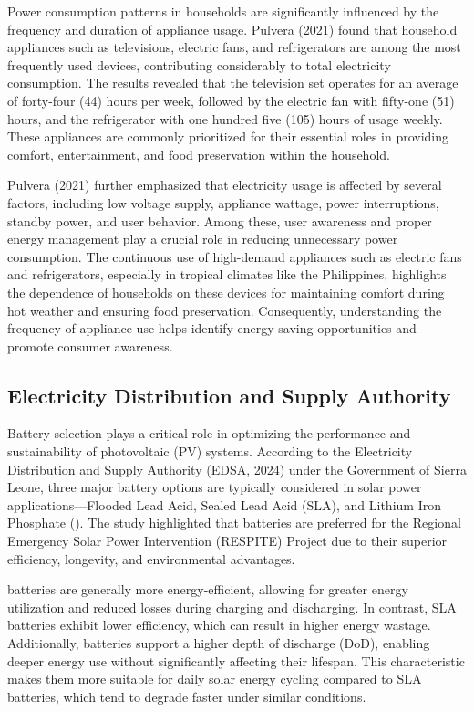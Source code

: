 {Power consumption patterns in households are significantly influenced by the frequency and duration of appliance usage. Pulvera (2021) found that household appliances such as televisions, electric fans, and refrigerators are among the most frequently used devices, contributing considerably to total electricity consumption. The results revealed that the television set operates for an average of forty-four (44) hours per week, followed by the electric fan with fifty-one (51) hours, and the refrigerator with one hundred five (105) hours of usage weekly. These appliances are commonly prioritized for their essential roles in providing comfort, entertainment, and food preservation within the household.

Pulvera (2021) further emphasized that electricity usage is affected by several factors, including low voltage supply, appliance wattage, power interruptions, standby power, and user behavior. Among these, user awareness and proper energy management play a crucial role in reducing unnecessary power consumption. The continuous use of high-demand appliances such as electric fans and refrigerators, especially in tropical climates like the Philippines, highlights the dependence of households on these devices for maintaining comfort during hot weather and ensuring food preservation. Consequently, understanding the frequency of appliance use helps identify energy-saving opportunities and promote consumer awareness.

\subsection{Electricity Distribution and Supply Authority}

Battery selection plays a critical role in optimizing the performance and sustainability of photovoltaic (PV) systems. According to the Electricity Distribution and Supply Authority (EDSA, 2024) under the Government of Sierra Leone, three major battery options are typically considered in solar power applications—Flooded Lead Acid, Sealed Lead Acid (SLA), and Lithium Iron Phosphate (). The study highlighted that  batteries are preferred for the Regional Emergency Solar Power Intervention (RESPITE) Project due to their superior efficiency, longevity, and environmental advantages.

 batteries are generally more energy-efficient, allowing for greater energy utilization and reduced losses during charging and discharging. In contrast, SLA batteries exhibit lower efficiency, which can result in higher energy wastage. Additionally,  batteries support a higher depth of discharge (DoD), enabling deeper energy use without significantly affecting their lifespan. This characteristic makes them more suitable for daily solar energy cycling compared to SLA batteries, which tend to degrade faster under similar conditions.

}

